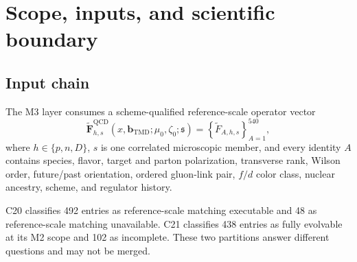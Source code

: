 \documentclass[11pt]{article}
\newcommand{\QCD}{\mathrm{QCD}}
\newcommand{\DY}{\mathrm{DY}}
\newcommand{\SIDIS}{\mathrm{SIDIS}}
\newcommand{\bM}{\bm b_{\mathrm{TMD}}}
\begin{document}
\begin{abstract}
The coefficient renormalization-group equation is derived in the project convention and tested by comparing two routes: matching at the reference scale followed by TMD evolution, and collinear evolution followed by rematching at the final scale.  Agreement is required only through the declared perturbative order and small-\(b\) power domain.  Rank-zero through rank-three Fourier--Bessel identities, heavy-flavor threshold transport, nonsinglet and singlet sum rules, hidden-color basis covariance, and resolved nuclear ancestry remain explicit.  The output is a capability-complete multi-\(Q\) operator ensemble whose unavailable entries are scientifically classified rather than filled by analogy.  This volume supplies formal requirements, software objects, benchmark families, negative tests, accuracy and uncertainty manifests, and the handoff to process-qualified \(\DY\), \(\SIDIS\), inclusive \(b_1\), tagged, and gluon-sensitive records.  Passing these gates does not establish all-order evolution, physical twist-three matching, a global extraction, or production readiness.
\end{abstract}

\tableofcontents
\newpage

\section{Scope, inputs, and scientific boundary}
\label{sec:scope}

\subsection{Input chain}

The M3 layer consumes a scheme-qualified reference-scale operator vector
\begin{equation}
 \widetilde{\bm F}^{\QCD}_{h,s}
 (x,\bM;\mu_0,\zeta_0;\mathfrak s)
 =
 \left\{
 \widetilde F_{A,h,s}
 \right\}_{A=1}^{540},
 \label{eq:input-vector}
\end{equation}
where \(h\in\{p,n,D\}\), \(s\) is one correlated microscopic member, and every identity \(A\) contains species, flavor, target and parton polarization, transverse rank, Wilson order, future/past orientation, ordered gluon-link pair, \(f/d\) color class, nuclear ancestry, scheme, and regulator history.

C20 classifies 492 entries as reference-scale matching executable and 48 as reference-scale matching unavailable.  C21 classifies 438 entries as fully evolvable at its M2 scope and 102 as incomplete.  These two partitions answer different questions and may not be merged.
\end{document}
